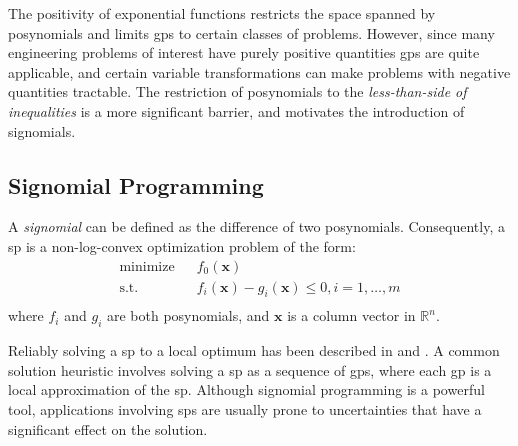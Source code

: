 The positivity of exponential functions restricts the space spanned by posynomials and limits
\gls{gp}s to certain classes of problems.
However, since many engineering problems of interest have purely positive quantities \gls{gp}s
are quite applicable, and certain variable transformations can make problems with negative quantities tractable.
The restriction of posynomials to the \emph{less-than-side of
inequalities} is a more significant barrier, and motivates the introduction of signomials.

\subsection{Signomial Programming}
A {\em signomial} can be defined as the difference of two posynomials. Consequently,
a \gls{sp} is a non-log-convex optimization problem of the form:
\begin{equation}
    \begin{split}
\text{minimize } &~~f_{0}(\mathbf{x}) \\
\text{s.t.} &~~f_{i}(\mathbf{x}) - g_{i}(\mathbf{x}) \leq 0, i = 1,\ldots, m \\
\end{split}
\end{equation}
where $f_{i}$ and $g_{i}$ are both posynomials, and $\mathbf{x}$ is a column vector in $\mathbb{R}^n$.

Reliably solving a \gls{sp} to a local optimum has been described in \cite{Boyd2007} and \cite{Lipp2016}.
A common solution heuristic involves solving a \gls{sp} as a sequence of \gls{gp}s,
where each \gls{gp} is a local approximation of the \gls{sp}.
Although signomial programming is a powerful tool, applications involving \gls{sp}s are usually prone
to uncertainties that have a significant effect on the solution.
